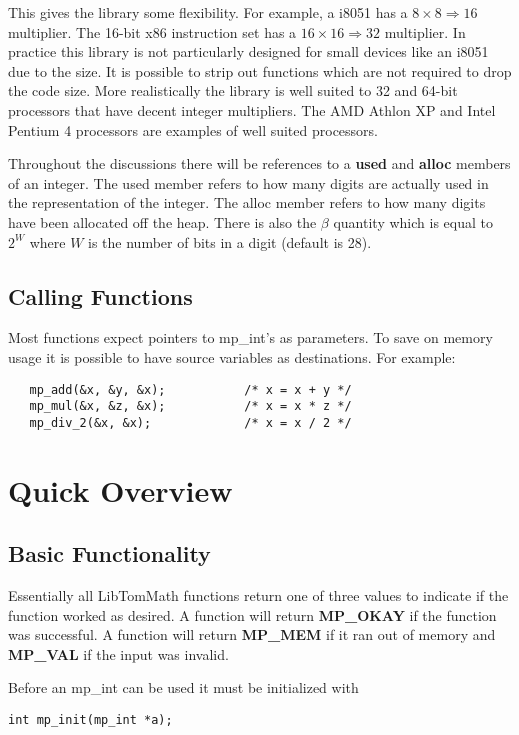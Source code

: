 \documentclass{article}
\begin{document}
This gives the library some flexibility.  For example, a i8051 has a $8 \times 8 \Rightarrow 16$ multiplier.  The 
16-bit x86 instruction set has a $16 \times 16 \Rightarrow 32$ multiplier.  In practice this library is not particularly
designed for small devices like an i8051 due to the size.  It is possible to strip out functions which are not required 
to drop the code size.  More realistically the library is well suited to 32 and 64-bit processors that have decent
integer multipliers.  The AMD Athlon XP and Intel Pentium 4 processors are examples of well suited processors.

Throughout the discussions there will be references to a \textbf{used} and \textbf{alloc} members of an integer.  The
used member refers to how many digits are actually used in the representation of the integer.  The alloc member refers
to how many digits have been allocated off the heap.  There is also the $\beta$ quantity which is equal to $2^W$ where 
$W$ is the number of bits in a digit (default is 28).  

\subsection{Calling Functions}
Most functions expect pointers to mp\_int's as parameters.   To save on memory usage it is possible to have source
variables as destinations.  For example:
\begin{verbatim}
   mp_add(&x, &y, &x);           /* x = x + y */
   mp_mul(&x, &z, &x);           /* x = x * z */
   mp_div_2(&x, &x);             /* x = x / 2 */
\end{verbatim}

\section{Quick Overview}

\subsection{Basic Functionality}
Essentially all LibTomMath functions return one of three values to indicate if the function worked as desired.  A 
function will return \textbf{MP\_OKAY} if the function was successful.  A function will return \textbf{MP\_MEM} if
it ran out of memory and \textbf{MP\_VAL} if the input was invalid.  

Before an mp\_int can be used it must be initialized with 

\begin{verbatim}
int mp_init(mp_int *a);
\end{verbatim}
\end{document}
